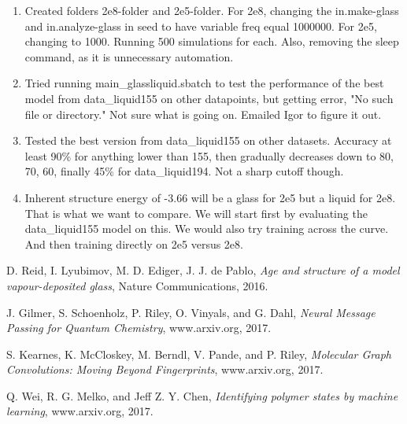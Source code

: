 \documentclass[12pt,reqno]{amsart}
\numberwithin{equation}{section}
\begin{document}
\begin{enumerate}
\item Created folders 2e8-folder and 2e5-folder.  For 2e8, changing the in.make-glass and in.analyze-glass in seed to have variable freq equal 1000000.  For 2e5, changing to 1000.    Running 500 simulations for each.  Also, removing the sleep command, as it is unnecessary automation.  

\item Tried running main\_glassliquid.sbatch to test the performance of the best model from data\_liquid155 on other datapoints, but getting error, "No such file or directory."  Not sure what is going on.  Emailed Igor to figure it out. 

\item Tested the best version from data\_liquid155 on other datasets.  Accuracy at least 90\% for anything lower than 155, then gradually decreases down to 80, 70, 60, finally 45\% for data\_liquid194.  Not a sharp cutoff though.  

\item Inherent structure energy of -3.66 will be a glass for 2e5 but a liquid for 2e8.  That is what we want to compare.  We will start first by evaluating the data\_liquid155 model on this.  We would also try training across the curve.  And then training directly on 2e5 versus 2e8.   




\end{enumerate}





\begin{thebibliography}{Al-F11}
D. Reid, I. Lyubimov, M. D. Ediger, J. J. de Pablo, \textit{Age and structure of a model vapour-deposited glass}, Nature Communications, 2016. 

 J. Gilmer, S. Schoenholz, P. Riley, O. Vinyals, and G. Dahl, \textit{Neural Message Passing for Quantum Chemistry}, www.arxiv.org, 2017.  

S. Kearnes, K. McCloskey, M. Berndl, V. Pande, and P. Riley, \textit{Molecular Graph Convolutions: Moving Beyond Fingerprints}, www.arxiv.org, 2017.

Q. Wei, R. G. Melko, and Jeff Z. Y. Chen, \textit{Identifying polymer states by machine learning}, www.arxiv.org, 2017.  

\end{thebibliography}
\end{document}
